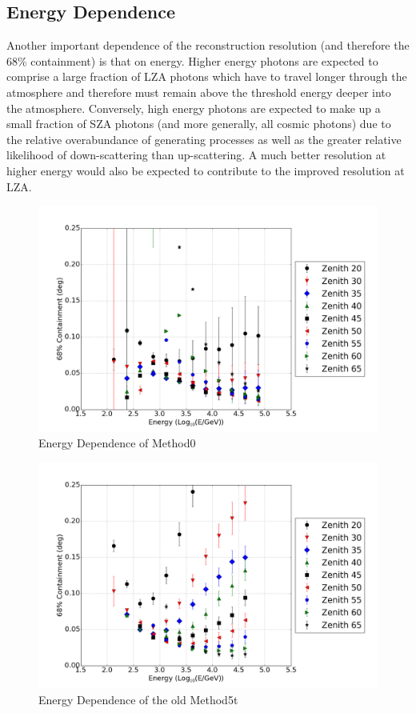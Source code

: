 \documentclass[main.tex]{subfiles}
\begin{document}
\subsection{Energy Dependence}
Another important dependence of the reconstruction resolution (and therefore the 68\% containment) is that on energy. Higher energy photons are expected to comprise a large fraction of LZA photons which have to travel longer through the atmosphere and therefore must remain above the threshold energy deeper into the atmosphere. Conversely, high energy photons are expected to make up a small fraction of SZA photons (and more generally, all cosmic photons) due to the relative overabundance of generating processes as well as the greater relative likelihood of down-scattering than up-scattering. A much better resolution at higher energy would also be expected to contribute to the improved resolution at LZA.

\begin{figure}[htbp]
  \centering
  \includegraphics[width=.9\linewidth]{images/reg_energy}
  \caption{Energy Dependence of Method0}
  \label{fig:energy_reg}
\end{figure}

\begin{figure}[htbp]
  \centering
  \includegraphics[width=.9\linewidth]{images/disp_standard_energy}
  \caption{Energy Dependence of the old Method5t}
  \label{fig:energy_disp_standard}    
\end{figure}
\end{document}
